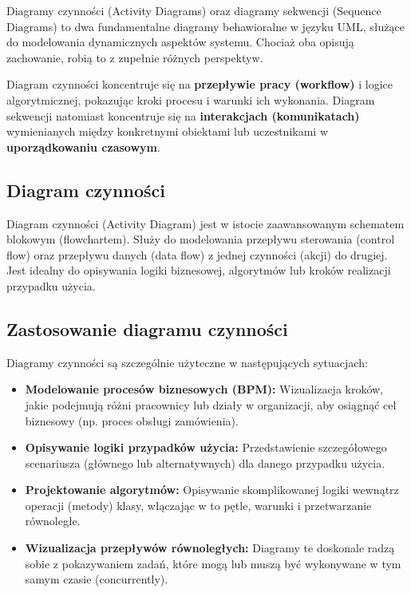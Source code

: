 \documentclass[a4paper,12pt]{article}
\begin{document}
Diagramy czynności (Activity Diagrams) oraz diagramy sekwencji (Sequence Diagrams) to dwa fundamentalne diagramy behawioralne w języku UML, służące do modelowania dynamicznych aspektów systemu. Chociaż oba opisują zachowanie, robią to z zupełnie różnych perspektyw. 

Diagram czynności koncentruje się na \textbf{przepływie pracy (workflow)} i logice algorytmicznej, pokazując kroki procesu i warunki ich wykonania. 
Diagram sekwencji natomiast koncentruje się na \textbf{interakcjach (komunikatach)} wymienianych między konkretnymi obiektami lub uczestnikami w \textbf{uporządkowaniu czasowym}.

\subsection{Diagram czynności}

Diagram czynności (Activity Diagram) jest w istocie zaawansowanym schematem blokowym (flowchartem). Służy do modelowania przepływu sterowania (control flow) oraz przepływu danych (data flow) z jednej czynności (akcji) do drugiej. Jest idealny do opisywania logiki biznesowej, algorytmów lub kroków realizacji przypadku użycia.

\subsection{Zastosowanie diagramu czynności}

Diagramy czynności są szczególnie użyteczne w następujących sytuacjach:
\begin{itemize}
    \item \textbf{Modelowanie procesów biznesowych (BPM):} Wizualizacja kroków, jakie podejmują różni pracownicy lub działy w organizacji, aby osiągnąć cel biznesowy (np. proces obsługi zamówienia).
    \item \textbf{Opisywanie logiki przypadków użycia:} Przedstawienie szczegółowego scenariusza (głównego lub alternatywnych) dla danego przypadku użycia.
    \item \textbf{Projektowanie algorytmów:} Opisywanie skomplikowanej logiki wewnątrz operacji (metody) klasy, włączając w to pętle, warunki i przetwarzanie równoległe.
    \item \textbf{Wizualizacja przepływów równoległych:} Diagramy te doskonale radzą sobie z pokazywaniem zadań, które mogą lub muszą być wykonywane w tym samym czasie (concurrently).
\end{itemize}
\end{document}
